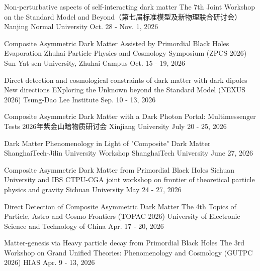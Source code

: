 \begin{talklist}

\talkentry
  {Non-perturbative aspects of self-interacting dark matter}
  {The 7th Joint Workshop on the Standard Model and Beyond（第七届标准模型及新物理联合研讨会）}
  {Nanjing Normal University}
  {Oct. 28 - Nov. 1, 2026}
  {}

\talkentry
  {Composite Asymmetric Dark Matter Assisted by Primordial Black Holes Evaporation}
  {Zhuhai Particle Physics and Cosmology Symposium (ZPCS 2026)}
  {Sun Yat-sen University, Zhuhai Campus}
  {Oct. 15 - 19, 2026}
  {}

\talkentry
  {Direct detection and cosmological constraints of dark matter with dark dipoles}
  {New directions EXploring the Unknown beyond the Standard Model (NEXUS 2026)}
  {Tsung-Dao Lee Institute}
  {Sep. 10 - 13, 2026}
  {}

\talkentry
  {Composite Asymmetric Dark Matter with a Dark Photon Portal: Multimessenger Tests}
  {2026年紫金山暗物质研讨会}
  {Xinjiang University}
  {July 20 - 25, 2026}
  {}

\talkentry
  {Dark Matter Phenomenology in Light of "Composite" Dark Matter}
  {ShanghaiTech-Jilin University Workshop}
  {ShanghaiTech University}
  {June 27, 2026}
  {}

\talkentry
  {Composite Asymmetric Dark Matter from Primordial Black Holes}
  {Sichuan University and IBS CTPU-CGA joint workshop on frontier of theoretical particle physics and gravity}
  {Sichuan University}
  {May 24 - 27, 2026}
  {}

\talkentry
  {Direct Detection of Composite Asymmetric Dark Matter}
  {The 4th Topics of Particle, Astro and Cosmo Frontiers (TOPAC 2026)}
  {University of Electronic Science and Technology of China}
  {Apr. 17 - 20, 2026}
  {}

\talkentry
  {Matter-genesis via Heavy particle decay from Primordial Black Holes}
  {The 3rd Workshop on Grand Unified Theories: Phenomenology and Cosmology (GUTPC 2026)}
  {HIAS}
  {Apr. 9 - 13, 2026}
  {}

\end{talklist}
